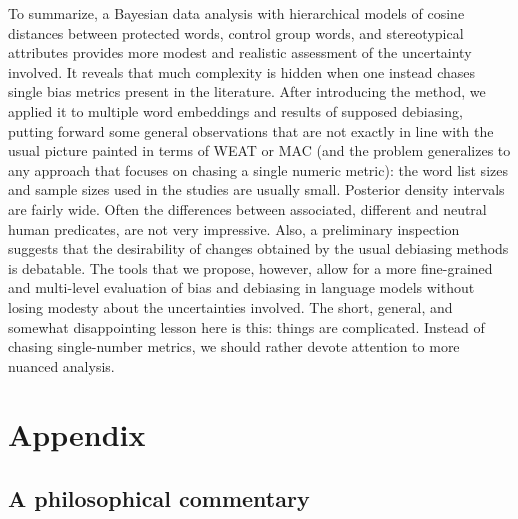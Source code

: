 \documentclass{clv3}
\begin{document}
To summarize, a Bayesian data analysis with hierarchical models of
cosine distances between protected words, control group words, and
stereotypical attributes provides more modest and realistic assessment
of the uncertainty involved. It reveals that much complexity is hidden
when one instead chases single bias metrics present in the literature. After introducing the method, we applied it to multiple word embeddings
and results of supposed debiasing, putting forward some general
observations that are not exactly in line with the usual picture painted
in terms of \textsf{WEAT} or \textsf{MAC} (and the problem generalizes
to any approach that focuses on chasing a single numeric metric): the
word list sizes and sample sizes used in the studies are usually small.
Posterior density intervals are fairly wide. Often the differences
between associated, different and neutral human predicates, are not very
impressive. Also, a preliminary inspection suggests that the
desirability of changes obtained by the usual debiasing methods is
debatable. The tools that we propose, however, allow for a more
fine-grained and multi-level evaluation of bias and debiasing in
language models without losing modesty about the uncertainties involved. The short, general, and somewhat disappointing lesson here is this: things
are complicated. Instead of chasing single-number metrics, we should
rather devote attention to more nuanced analysis.






























\newpage


\appendix

\hypertarget{appendix}{%
\section{Appendix}\label{appendix}}

\label{sec:appendix}


\hypertarget{philosophical}{%
	\subsection{A philosophical commentary}}
\end{document}
